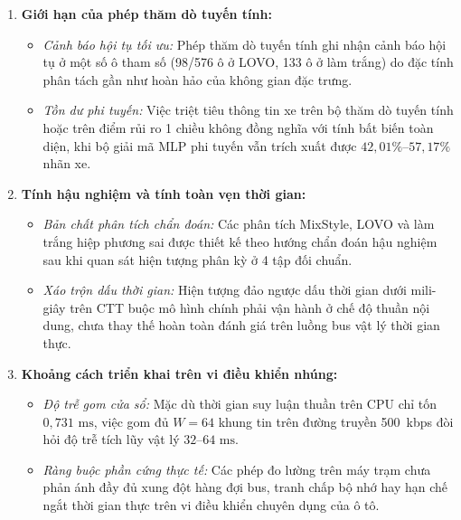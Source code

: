 \documentclass[12pt, a4paper, reqno, oneside]{book}
\begin{document}
\begin{enumerate}
    \item \textbf{Giới hạn của phép thăm dò tuyến tính:}
    \begin{itemize}
        \item \textit{Cảnh báo hội tụ tối ưu:} Phép thăm dò tuyến tính ghi nhận cảnh báo hội tụ ở một số ô tham số (98/576 ô ở LOVO, 133 ô ở làm trắng) do đặc tính phân tách gần như hoàn hảo của không gian đặc trưng.
        \item \textit{Tồn dư phi tuyến:} Việc triệt tiêu thông tin xe trên bộ thăm dò tuyến tính hoặc trên điểm rủi ro 1 chiều không đồng nghĩa với tính bất biến toàn diện, khi bộ giải mã MLP phi tuyến vẫn trích xuất được $42{,}01\%\text{--}57{,}17\%$ nhãn xe.
    \end{itemize}

    \item \textbf{Tính hậu nghiệm và tính toàn vẹn thời gian:}
    \begin{itemize}
        \item \textit{Bản chất phân tích chẩn đoán:} Các phân tích MixStyle, LOVO và làm trắng hiệp phương sai được thiết kế theo hướng chẩn đoán hậu nghiệm sau khi quan sát hiện tượng phân kỳ ở 4 tập đối chuẩn.
        \item \textit{Xáo trộn dấu thời gian:} Hiện tượng đảo ngược dấu thời gian dưới mili-giây trên CTT buộc mô hình chính phải vận hành ở chế độ thuần nội dung, chưa thay thế hoàn toàn đánh giá trên luồng bus vật lý thời gian thực.
    \end{itemize}

    \item \textbf{Khoảng cách triển khai trên vi điều khiển nhúng:}
    \begin{itemize}
        \item \textit{Độ trễ gom cửa sổ:} Mặc dù thời gian suy luận thuần trên CPU chỉ tốn $0{,}731\text{ ms}$, việc gom đủ $W=64$ khung tin trên đường truyền 500~kbps đòi hỏi độ trễ tích lũy vật lý $32\text{--}64\text{ ms}$.
        \item \textit{Ràng buộc phần cứng thực tế:} Các phép đo lường trên máy trạm chưa phản ánh đầy đủ xung đột hàng đợi bus, tranh chấp bộ nhớ hay hạn chế ngắt thời gian thực trên vi điều khiển chuyên dụng của ô tô.
    \end{itemize}
\end{enumerate}
\end{document}
